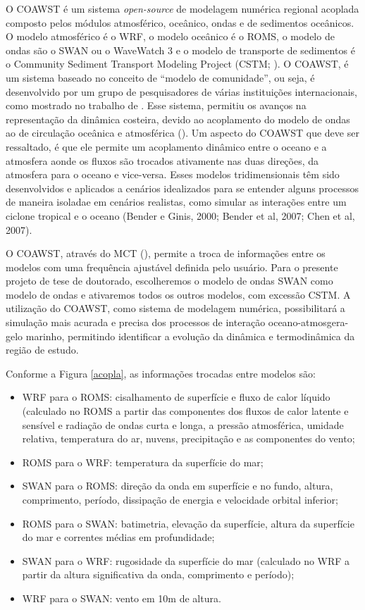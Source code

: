 \documentclass{article}
\begin{document}
O COAWST é um sistema \textit{open-source} de modelagem numérica regional acoplada composto pelos módulos atmosférico, oceânico, ondas e de sedimentos oceânicos. 
O modelo atmosférico é o WRF, o modelo oceânico é o ROMS, o modelo de ondas são o SWAN ou o WaveWatch 3  e o modelo de transporte de sedimentos é o Community 
Sediment Transport  Modeling  Project (CSTM; \cite{Warner2008}). O COAWST, é um sistema baseado no conceito de “modelo de comunidade”, ou seja,
é desenvolvido por um grupo de pesquisadores de várias instituições internacionais, como  mostrado  no trabalho de \textcite{Warner2010}.
Esse  sistema, permitiu os avanços na representação da dinâmica costeira, devido ao acoplamento do modelo de ondas ao de circulação  oceânica e
atmosférica (\cite{Warner2008}). Um aspecto do COAWST que deve ser ressaltado, é que ele permite um acoplamento dinâmico   
entre o oceano e a atmosfera aonde os fluxos são trocados ativamente nas duas direções, da atmosfera 
para o oceano e vice-versa. Esses modelos tridimensionais têm sido desenvolvidos e aplicados a cenários idealizados 
para se entender alguns processos de maneira isoladae em cenários realistas, como simular as interações entre um ciclone 
tropical e o oceano (Bender e  Ginis,  2000;  Bender  et  al,  2007;  Chen  et  al,  2007).  

O COAWST, através do MCT (\cite{Jacob2005}), permite a troca 
de informações entre os modelos com uma frequência ajustável definida pelo usuário. Para o presente projeto de tese de doutorado, 
escolheremos o modelo de ondas SWAN como modelo de ondas e ativaremos todos os outros modelos, com excessão
CSTM. A utilização do COAWST, como sistema de modelagem numérica, possibilitará a simulação mais acurada e precisa
dos processos de interação oceano-atmosgera-gelo marinho, permitindo identificar a evolução da dinâmica e termodinâmica
da região de estudo.

 Conforme a \textcolor{bleu_cite}{Figura \ref{acopla}}, as informações trocadas entre modelos são:

\begin{itemize}
\item WRF para o ROMS: cisalhamento de superfície e fluxo de calor líquido (calculado no ROMS a partir das componentes dos fluxos de calor latente e sensível e radiação de ondas curta e longa, a pressão atmosférica, umidade relativa, temperatura do ar, nuvens, precipitação e as componentes do vento;
\item ROMS para o WRF: temperatura da superfície do mar;
\item SWAN para o ROMS: direção da onda em superfície e no fundo, altura, comprimento, período, dissipação de energia e velocidade orbital inferior;
\item ROMS para o SWAN: batimetria, elevação da superfície, altura da superfície do mar e correntes médias em profundidade;
\item SWAN para o WRF: rugosidade da superfície do mar (calculado no WRF a partir da altura significativa da onda, comprimento e período);
\item WRF para o SWAN: vento em 10m de altura.
\end{itemize}
\bigskip
\end{document}
